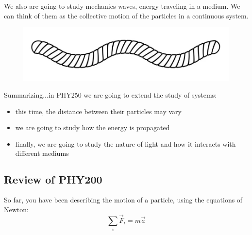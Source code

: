 \documentclass[]{beamer}
\begin{document}
  \begin{frame}

We also are going to study mechanics waves, energy traveling in a medium.
We can think of them as the collective motion of the particles in a continuous system.
    
      \begin{figure}[h!]
        \begin{center}
          \includegraphics[height=1.in]{images/oscillations.PNG}
        \end{center}
      \end{figure}
       
    
    
    \end{frame}

\begin{frame}
Summarizing...in PHY250 we are going to extend the study of systems:

\vspace{5mm}

\pause
\begin{itemize}
  \item this time, the distance between their particles  may vary
  \pause
  \item we are going to study how the energy is propagated 
  \pause 
  \item finally, we are going to study the nature of light and how it interacts with different mediums 
\end{itemize}

  
    
\end{frame}


\subsection{Review of PHY200}

\begin{frame}

So far, you have been describing the motion of a particle, using the equations of Newton:
\pause
\vspace{5mm}
\begin{equation}
  \sum_i\vec{F}_i=m\vec{a}
\end{equation}


\end{frame}
\end{document}
